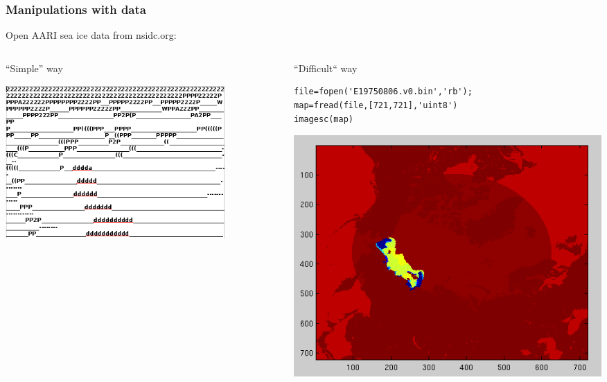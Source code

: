 \documentclass{beamer}
\begin{document}
\begin{frame}[fragile]
\frametitle{Manipulations with data} 
\begin{center}
Open AARI sea ice data from nsidc.org:\\ \end{center}

\begin{columns}[t]
\begin{column}{.5\textwidth}
``Simple'' way


\includegraphics[width=0.8\textwidth,angle=00]{binSoffice.png}

\end{column}
\begin{column}{.5\textwidth}
``Difficult`` way

\begin{lstlisting}
file=fopen('E19750806.v0.bin','rb');
map=fread(file,[721,721],'uint8')
imagesc(map)
\end{lstlisting}
\includegraphics[width=\textwidth,angle=00]{matlabAARI.png}
\end{column}
\end{columns}

\end{frame}
\end{document}
